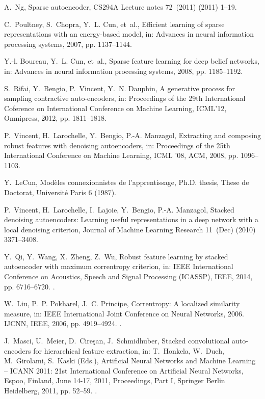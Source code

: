 \documentclass[preprint,5p,compress]{elsarticle}
\begin{document}
\begin{thebibliography}{100}
A.~Ng, Sparse autoencoder, CS294A Lecture notes 72~(2011) (2011) 1--19.

C.~Poultney, S.~Chopra, Y.~L. Cun, et~al., Efficient learning of sparse
  representations with an energy-based model, in: Advances in neural
  information processing systems, 2007, pp. 1137--1144.

Y.-l. Boureau, Y.~L. Cun, et~al., Sparse feature learning for deep belief
  networks, in: Advances in neural information processing systems, 2008, pp.
  1185--1192.

S.~Rifai, Y.~Bengio, P.~Vincent, Y.~N. Dauphin, A generative process for
  sampling contractive auto-encoders, in: Proceedings of the 29th International
  Coference on International Conference on Machine Learning, ICML'12,
  Omnipress, 2012, pp. 1811--1818.

P.~Vincent, H.~Larochelle, Y.~Bengio, P.-A. Manzagol, Extracting and composing
  robust features with denoising autoencoders, in: Proceedings of the 25th
  International Conference on Machine Learning, {ICML} '08, {ACM}, 2008, pp.
  1096--1103.

Y.~LeCun, Mod{\`e}les connexionnistes de l'apprentissage, Ph.D. thesis, These
  de Doctorat, Universit{\'e} Paris 6 (1987).

P.~Vincent, H.~Larochelle, I.~Lajoie, Y.~Bengio, P.-A. Manzagol, Stacked
  denoising autoencoders: Learning useful representations in a deep network
  with a local denoising criterion, Journal of Machine Learning Research
  11~(Dec) (2010) 3371--3408.

Y.~Qi, Y.~Wang, X.~Zheng, Z.~Wu, Robust feature learning by stacked autoencoder
  with maximum correntropy criterion, in: {IEEE} International Conference on
  Acoustics, Speech and Signal Processing ({ICASSP}), {IEEE}, 2014, pp.
  6716--6720.
\newblock \href {http://dx.doi.org/10.1109/ICASSP.2014.6854900}
  {}.

W.~Liu, P.~P. Pokharel, J.~C. Principe, Correntropy: A localized similarity
  measure, in: IEEE International Joint Conference on Neural Networks, 2006.
  {IJCNN}, {IEEE}, 2006, pp. 4919--4924.
\newblock \href {http://dx.doi.org/10.1109/IJCNN.2006.247192}
  {}.

J.~Masci, U.~Meier, D.~Cire{\c{s}}an, J.~Schmidhuber, Stacked convolutional
  auto-encoders for hierarchical feature extraction, in: T.~Honkela, W.~Duch,
  M.~Girolami, S.~Kaski (Eds.), Artificial Neural Networks and Machine Learning
  -- ICANN 2011: 21st International Conference on Artificial Neural Networks,
  Espoo, Finland, June 14-17, 2011, Proceedings, Part I, Springer Berlin
  Heidelberg, 2011, pp. 52--59.
\newblock \href {http://dx.doi.org/10.1007/978-3-642-21735-7\_7}
  {}.


\end{thebibliography}
\end{document}

